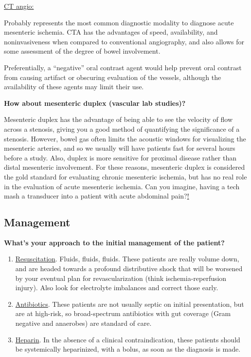 \documentclass[
]{book}
\begin{document}
\uline{CT angio:}

Probably represents the most common diagnostic modality to diagnose
acute mesenteric ischemia. CTA has the advantages of speed,
availability, and noninvasiveness when compared to conventional
angiography, and also allows for some assessment of the degree of bowel
involvement.~

Preferentially, a ``negative'' oral contrast agent would help prevent oral
contrast from causing artifact or obscuring evaluation of the vessels,
although the availability of these agents may limit their use.

\textbf{How about mesenteric duplex (vascular lab studies)?}

Mesenteric duplex has the advantage of being able to see the velocity of
flow across a stenosis, giving you a good method of quantifying the
significance of a stenosis. However, bowel gas often limits the acoustic
windows for visualizing the mesenteric arteries, and so we usually will
have patients fast for several hours before a study. Also, duplex is
more sensitive for proximal disease rather than distal mesenteric
involvement. For these reasons, mesenteric duplex is considered the gold
standard for evaluating chronic mesenteric ischemia, but has no real
role in the evaluation of acute mesenteric ischemia. Can you imagine,
having a tech mash a transducer into a patient with acute abdominal
pain?\uline{!}~

\hypertarget{management-23}{%
\subsection{Management}\label{management-23}}

\textbf{What's your approach to the initial management of the patient?}

\begin{enumerate}
\def\labelenumi{\arabic{enumi}.}
\item
  \uline{Resuscitation}. Fluids, fluids, fluids. These patients
  are really volume down, and are headed towards a profound
  distributive shock that will be worsened by your eventual plan for
  revascularization (think ischemia-reperfusion injury). Also look for
  electrolyte imbalances and correct those early.
\item
  \uline{Antibiotics}. These patients are not usually septic on
  initial presentation, but are at high-risk, so broad-spectrum
  antibiotics with gut coverage (Gram negative and anaerobes) are
  standard of care.
\item
  \uline{Heparin}. In the absence of a clinical
  contraindication, these patients should be systemically heparinized,
  with a bolus, as soon as the diagnosis is made.~
\end{enumerate}
\end{document}
